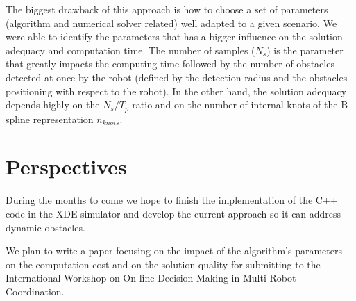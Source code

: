 The biggest drawback of this approach is how to choose a set of parameters (algorithm and numerical solver related) well adapted to a given scenario. We were able to identify the parameters that has a bigger influence on the solution adequacy and computation time. The number of samples ($N_s$) is the parameter that greatly impacts the computing time followed by the number of obstacles detected at once by the robot (defined by the detection radius and the obstacles positioning with respect to the robot). In the other hand, the solution adequacy depends highly on the $N_s/T_p$ ratio and on the number of internal knots of the B-spline representation $n_{knots}$.


\section{Perspectives}

During the months to come we hope to finish the implementation of the C++ code in the XDE simulator and develop the current approach so it can address dynamic obstacles.

We plan to write a paper focusing on the impact of the algorithm's parameters on the computation cost and on the solution quality  for submitting to the International Workshop on On-line Decision-Making in Multi-Robot Coordination.




% 
{}





